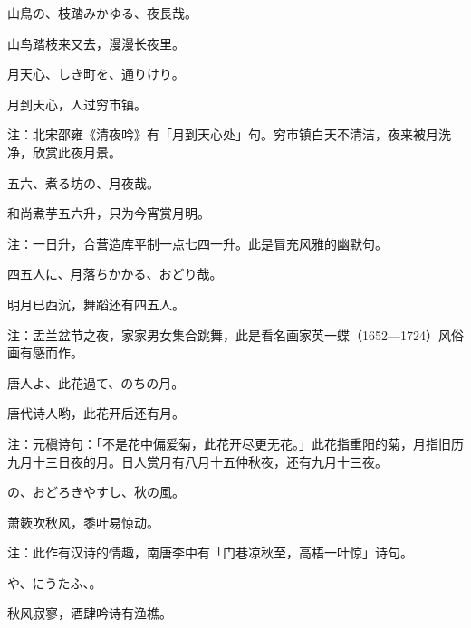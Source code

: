 \begin{haiku}
    {\FH 山鳥の、枝踏みかゆる、夜長哉。}

    {\FK 山鸟踏枝来又去，漫漫长夜里。}
\end{haiku}

\begin{haiku}
    {\FH 月天心、しき町を、通りけり。}

    {\FK 月到天心，人过穷市镇。}

    {\FT 注：北宋邵雍《清夜吟》有「月到天心处」句。穷市镇白天不清洁，夜来被月洗净，欣赏此夜月景。}
\end{haiku}

\begin{haiku}
    {\FH 五六、煮る坊の、月夜哉。}

    {\FK 和尚煮芋五六升，只为今宵赏月明。}

    {\FT 注：一日升，合营造库平制一点七四一升。此是冒充风雅的幽默句。}
\end{haiku}

\begin{haiku}
    {\FH 四五人に、月落ちかかる、おどり哉。}

    {\FK 明月已西沉，舞蹈还有四五人。}

    {\FT 注：盂兰盆节之夜，家家男女集合跳舞，此是看名画家英一蝶（1652—1724）风俗画有感而作。}
\end{haiku}

\begin{haiku}
    {\FH 唐人よ、此花過て、のちの月。}

    {\FK 唐代诗人哟，此花开后还有月。}

    {\FT 注：元稹诗句：「不是花中偏爱菊，此花开尽更无花。」此花指重阳的菊，月指旧历九月十三日夜的月。日人赏月有八月十五仲秋夜，还有九月十三夜。}
\end{haiku}

\begin{haiku}
    {\FH {}の、おどろきやすし、秋の風。}

    {\FK 萧簌吹秋风，黍叶易惊动。}

    {\FT 注：此作有汉诗的情趣，南唐李中有「门巷凉秋至，高梧一叶惊」诗句。}
\end{haiku}

\begin{haiku}
    {\FH {}や、にうたふ、。}

    {\FK 秋风寂寥，酒肆吟诗有渔樵。}
\end{haiku}

